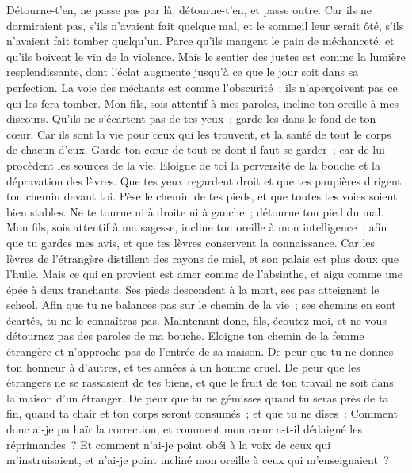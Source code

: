\begin{multicols}{2}
Détourne-t'en, ne passe pas par là, détourne-t'en, et passe outre.
Car ils ne dormiraient pas, s'ils n'avaient fait quelque mal, et le sommeil leur serait ôté, s'ils n'avaient fait tomber quelqu'un.
Parce qu'ils mangent le pain de méchanceté, et qu'ils boivent le vin de la violence.
Mais le sentier des justes est comme la lumière resplendissante, dont l'éclat augmente jusqu'à ce que le jour soit dans sa perfection.
La voie des méchants est comme l'obscurité~; ils n'aperçoivent pas ce qui les fera tomber.
Mon fils, sois attentif à mes paroles, incline ton oreille à mes discours.
Qu'ils ne s'écartent pas de tes yeux~; garde-les dans le fond de ton cœur.
Car ils sont la vie pour ceux qui les trouvent, et la santé de tout le corps de chacun d'eux.
Garde ton cœur de tout ce dont il faut se garder~; car de lui procèdent les sources de la vie.
Eloigne de toi la perversité de la bouche et la dépravation des lèvres.
Que tes yeux regardent droit et que tes paupières dirigent ton chemin devant toi.
Pèse le chemin de tes pieds, et que toutes tes voies soient bien stables.
Ne te tourne ni à droite ni à gauche~; détourne ton pied du mal.
\VerseOne{}Mon fils, sois attentif à ma sagesse, incline ton oreille à mon intelligence~;
afin que tu gardes mes avis, et que tes lèvres conservent la connaissance.
Car les lèvres de l'étrangère distillent des rayons de miel, et son palais est plus doux que l'huile.
Mais ce qui en provient est amer comme de l'absinthe, et aigu comme une épée à deux tranchants.
Ses pieds descendent à la mort, ses pas atteignent le scheol.
Afin que tu ne balances pas sur le chemin de la vie~; ses chemins en sont écartés, tu ne le connaîtras pas.
Maintenant donc, fils, écoutez-moi, et ne vous détournez pas des paroles de ma bouche.
Eloigne ton chemin de la femme étrangère et n'approche pas de l'entrée de sa maison.
De peur que tu ne donnes ton honneur à d'autres, et tes années à un homme cruel.
De peur que les étrangers ne se rassasient de tes biens, et que le fruit de ton travail ne soit dans la maison d'un étranger.
De peur que tu ne gémisses quand tu seras près de ta fin, quand ta chair et ton corps seront consumés~;
et que tu ne dises~: Comment donc ai-je pu haïr la correction, et comment mon cœur a-t-il dédaigné les réprimandes~?
Et comment n'ai-je point obéi à la voix de ceux qui m'instruisaient, et n'ai-je point incliné mon oreille à ceux qui m'enseignaient~?

\end{multicols}
